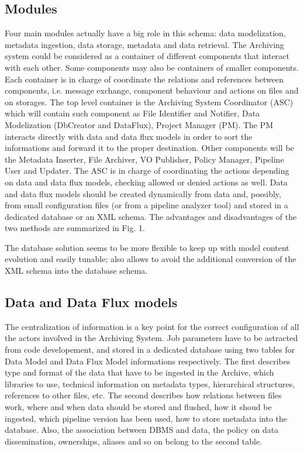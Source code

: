 \documentclass[11pt,twoside]{article}
\begin{document}
\subsection{Modules}
Four main modules actually have a big role in this schema: data modelization,
metadata ingestion, data storage, metadata and data retrieval.
The Archiving system could be considered as a container of different components
that interact with each other. Some components may also be containers of smaller
components. Each container is in charge of coordinate the relations and references
between components, i.e. message exchange, component behaviour and actions on
files and on storages. The top level container is the Archiving System Coordinator
(ASC) which will contain such component as File Identifier and Notifier, Data
Modelization (DbCreator and DataFlux), Project Manager (PM). The PM interacts
directly with data and data flux models in order to sort the informations and
forward it to the proper destination. Other components will be the  Metadata
Inserter, File Archiver, VO Publisher, Policy Manager, Pipeline User and Updater.
The ASC is in charge of coordinating the actions depending on data and data flux
models, checking allowed or denied actions as well. Data and data flux models should
be created dynamically from data and, possibly, from small configuration files (or
from a pipeline analyzer tool) and stored in a dedicated database
or an XML schema. The advantages and disadvantages of the two methods are
summarized in Fig. 1.


The database solution seems to be more flexible to keep up with model content
evolution and easily tunable; also allows to avoid the additional conversion
of the XML schema into the database schema.

\subsection{Data and  Data Flux models}
The centralization of information is a key point for the correct configuration of
all the actors involved in the Archiving System. Job parameters have to be astracted
from code developement, and stored in a dedicated database using two tables for Data
Model and Data Flux Model informations respectively. The first describes type and
format of the data that have to be ingested in the Archive, which libraries to use,
technical information on metadata types, hierarchical structures, references to other
files, etc. The second describes how relations between files work, where and when data
should be stored and flushed, how it shoud be ingested, which pipeline version has
been used, how to store metadata into the database. Also, the association between
DBMS and data, the policy on data dissemination, ownerships, aliases and so on belong
to the second table.
\end{document}
